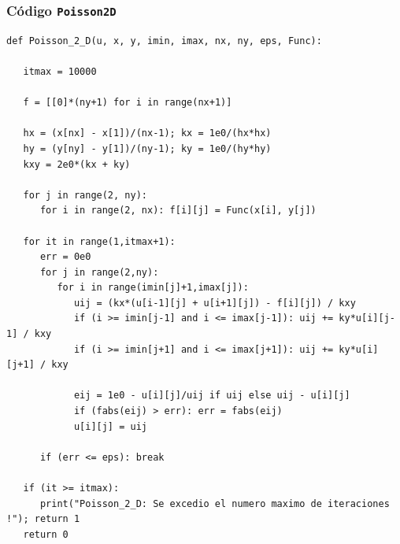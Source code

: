 \begin{frame}
\frametitle{Código \texttt{Poisson2D}}
\begin{lstlisting}[caption=Código para resolver un dominio irregular, style=FormattedNumber, basicstyle=\linespread{1.1}\ttfamily=\small, columns=fullflexible]
def Poisson_2_D(u, x, y, imin, imax, nx, ny, eps, Func):

   itmax = 10000

   f = [[0]*(ny+1) for i in range(nx+1)]

   hx = (x[nx] - x[1])/(nx-1); kx = 1e0/(hx*hx)
   hy = (y[ny] - y[1])/(ny-1); ky = 1e0/(hy*hy) 
   kxy = 2e0*(kx + ky)

   for j in range(2, ny):
      for i in range(2, nx): f[i][j] = Func(x[i], y[j])

   for it in range(1,itmax+1):
      err = 0e0
      for j in range(2,ny):
         for i in range(imin[j]+1,imax[j]):
            uij = (kx*(u[i-1][j] + u[i+1][j]) - f[i][j]) / kxy
            if (i >= imin[j-1] and i <= imax[j-1]): uij += ky*u[i][j-1] / kxy
            if (i >= imin[j+1] and i <= imax[j+1]): uij += ky*u[i][j+1] / kxy

            eij = 1e0 - u[i][j]/uij if uij else uij - u[i][j]
            if (fabs(eij) > err): err = fabs(eij)
            u[i][j] = uij

      if (err <= eps): break

   if (it >= itmax):
      print("Poisson_2_D: Se excedio el numero maximo de iteraciones !"); return 1
   return 0
\end{lstlisting}
\end{frame}
